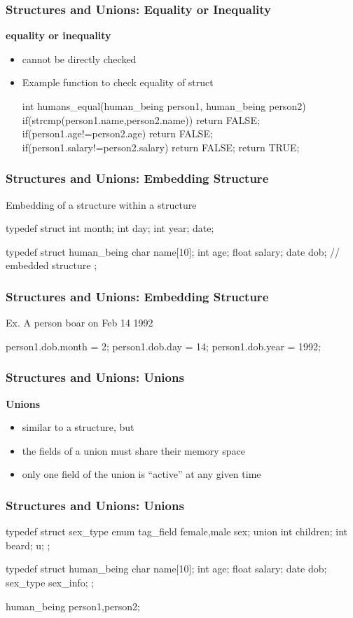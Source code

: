\documentclass[newPxFont,sthlmFooter,nooffset]{beamer}
\begin{document}
\begin{frame}[t, fragile]
  \frametitle{Structures and Unions: Equality or Inequality}
\textbf{equality or inequality}
\begin{itemize}
\item cannot be directly checked
\item Example function to check equality of struct
\begin{codedef}
int humans_equal(human_being person1, human_being person2) { 
    if(strcmp(person1.name,person2.name))
        return FALSE; 
    if(person1.age!=person2.age)
        return FALSE; 
    if(person1.salary!=person2.salary)
        return FALSE; 
    return TRUE;
}    
\end{codedef}
\end{itemize}

\end{frame}


\begin{frame}[t, fragile]
  \frametitle{Structures and Unions: Embedding Structure}
Embedding of a structure within a structure
\begin{codedef}
typedef struct { 
    int month; 
    int day;
    int year;
} date;

typedef struct human_being { 
    char name[10];
    int age;
    float salary;
    date dob; // embedded structure
};  
\end{codedef}
\end{frame}

\begin{frame}[t, fragile]
  \frametitle{Structures and Unions: Embedding Structure}
Ex. A person boar on Feb 14 1992
\begin{codedef}
person1.dob.month = 2;
person1.dob.day = 14;
person1.dob.year = 1992;
\end{codedef}
\end{frame}


\begin{frame}[t]
  \frametitle{Structures and Unions: Unions}
\textbf{Unions}
\begin{itemize}
\item similar to a structure, but
\item the fields of a union must share their memory space
\item only one field of the union is ``active'' at any given time
\end{itemize}
\end{frame}

\begin{frame}[t, fragile]
  \frametitle{Structures and Unions: Unions}
\begin{codedef}
typedef struct sex_type {
    enum tag_field {female,male} sex; 
    union {
        int children;
        int beard; } u;
};

typedef struct human_being {
    char name[10]; 
    int age;
    float salary; 
    date dob; 
    sex_type sex_info;
};

human_being person1,person2;    
\end{codedef}
\end{frame}
\end{document}
